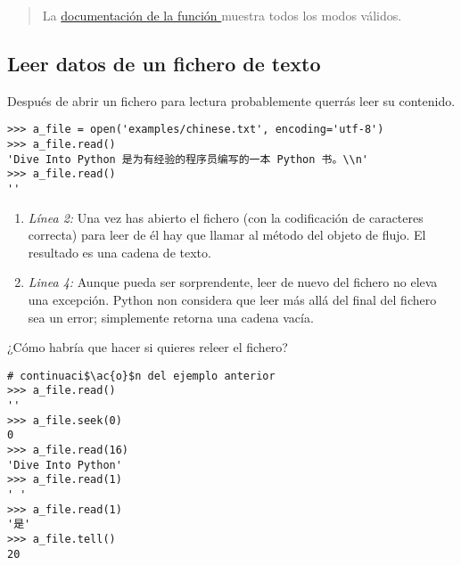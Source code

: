 \begin{quote}
La \href{http://docs.python.org/3.1/library/io.html#module-interface}{documentación de la función } muestra todos los modos válidos.
\end{quote}

\subsection{Leer datos de un fichero de texto}

Después de abrir un fichero para lectura probablemente querrás leer su contenido.

\noindent\begin{minipage}{\textwidth}
\begin{lstlisting}[mathescape=True,escapeinside=@@]
>>> a_file = open('examples/chinese.txt', encoding='utf-8')
>>> a_file.read()
'Dive Into Python 是为有经验的程序员编写的一本 Python 书。\\n'
>>> a_file.read()
''
\end{lstlisting}
\end{minipage}

\begin{enumerate}

\item \emph{Línea 2:} Una vez has abierto el fichero (con la codificación de caracteres correcta) para leer de él hay que llamar al método  del objeto de flujo. El resultado es una cadena de texto.

\item \emph{Linea 4:} Aunque pueda ser sorprendente, leer de nuevo del fichero no eleva una excepción. Python non considera que leer más allá del final del fichero sea un error; simplemente retorna una cadena vacía.

\end{enumerate}


¿Cómo habría que hacer si quieres releer el fichero?

\noindent\begin{minipage}{\textwidth}
\begin{lstlisting}[mathescape=True,escapeinside=@@]
# continuaci$\ac{o}$n del ejemplo anterior
>>> a_file.read()
''
>>> a_file.seek(0)
0
>>> a_file.read(16)
'Dive Into Python'
>>> a_file.read(1)
' '
>>> a_file.read(1)
'是'
>>> a_file.tell()
20
\end{lstlisting}
\end{minipage}

